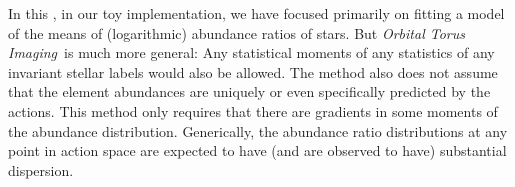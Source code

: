 \documentclass[modern]{aastex63}
\newcommand{\methodname}{\textsl{Orbital Torus Imaging}}
\begin{document}
In this \documentname, in our toy implementation, we have focused primarily on
fitting a model of the means of (logarithmic) abundance ratios of stars.
But \methodname\ is much more general:
Any statistical moments of any statistics of any invariant stellar labels would
also be allowed.
The method also does not assume that the element abundances are uniquely or even
specifically predicted by the actions.
This method only requires that there are gradients in some moments of the
abundance distribution.
Generically, the abundance ratio distributions at any point in action space are
expected to have (and are observed to have) substantial dispersion.


\end{document}
